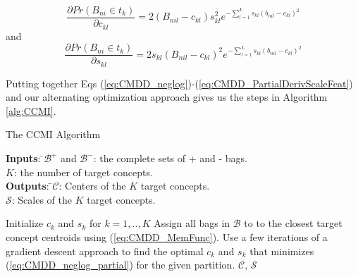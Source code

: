 \documentclass[12pt,dvips]{report}
\numberwithin{equation}{section}
\begin{document}
\begin{equation}  \label{eq:CMDD_PartialDerivCentFeat}
\frac{\partial Pr(B_{ni}\!\!\in\!\!t_{k})}{\partial c_{kl}}=2(B_{nil}-c_{kl})s_{kl}^{2} e^{-\sum_{l=1}^{L}s_{kl}(b_{nil}-c_{kl})^{2}}
\end{equation}
and
\begin{equation} \label{eq:CMDD_PartialDerivScaleFeat}
\frac{\partial Pr(B_{ni}\!\!\in\!\!t_{k})}{\partial s_{kl}}=2s_{kl}(B_{nil}\!-\!c_{kl})^{2}e^{-\sum_{l=1}^{L}s_{kl}(b_{nil}-c_{kl})^{2}}
\end{equation}

Putting together Eqs (\ref{eq:CMDD_neglog})-(\ref{eq:CMDD_PartialDerivScaleFeat}) and our alternating optimization approach gives us the steps in Algorithm \ref{alg:CCMI}.

\begin{algorithm}
  \caption{The CCMI Algorithm}
  \label{alg:CCMI}
  {\begin{tabbing}
  \textbf{Inputs}: \=$\mathcal{B}^+$ and $\mathcal{B}^-$: the complete sets of + and - bags.\\
   \>$K$: the number of target concepts.\\
   \textbf{Outputs}: \=$\mathcal{C}$: Centers of the $K$ target concepts.\\
     \>$\mathcal{S}$: Scales of the $K$ target concepts.\\
   \end{tabbing}}
  \begin{algorithmic}
    \STATE Initialize $c_{k}$ and $s_{k}$ for $k=1, .., K$
    \REPEAT 
       \STATE Assign all bags in $\mathcal{B}$ to to the closest target concept centroids using (\ref{eq:CMDD_MemFunc}).
       \STATE Use a few iterations of a gradient descent approach \cite{maro98} to find the optimal $c_{k}$  and $s_{k}$ that minimizes (\ref{eq:CMDD_neglog_partial}) for the given partition. \ENDFOR
    \RETURN $\mathcal{C}$, $\mathcal{S}$
  \end{algorithmic}
\end{algorithm}
\end{document}
